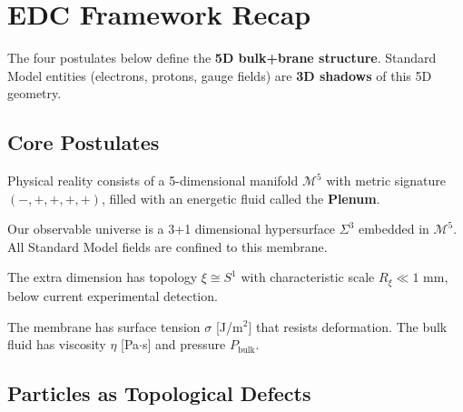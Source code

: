 \section{EDC Framework Recap}
\label{sec:ch2_framework_recap}

\begin{tcolorbox}[colback=gray!5!white, colframe=gray!50!black,
    title=\textbf{5D Cause Statement}]
The four postulates below define the \textbf{5D bulk+brane structure}. Standard Model
entities (electrons, protons, gauge fields) are \textbf{3D shadows} of this 5D geometry.
\end{tcolorbox}

\subsection{Core Postulates}

\begin{postulate}[5D Bulk]
\label{post:ch2_5d_bulk}
Physical reality consists of a 5-dimensional manifold $\mathcal{M}^5$ with metric signature
$(-,+,+,+,+)$, filled with an energetic fluid called the \textbf{Plenum}.
\end{postulate}

\begin{postulate}[3D Membrane]
\label{post:ch2_membrane}
Our observable universe is a 3+1 dimensional hypersurface $\Sigma^3$ embedded in $\mathcal{M}^5$.
All Standard Model fields are confined to this membrane.
\end{postulate}

\begin{postulate}
\label{post:ch2_compact}
The extra dimension has topology $\xi \cong S^1$ with characteristic scale $R_\xi \ll 1$ mm,
below current experimental detection.
\end{postulate}

\begin{postulate}
\label{post:ch2_tension}
The membrane has surface tension $\sigma$ [J/m$^2$] that resists deformation.
The bulk fluid has viscosity $\eta$ [Pa$\cdot$s] and pressure $P_{\text{bulk}}$.
\end{postulate}

\subsection{Particles as Topological Defects}

